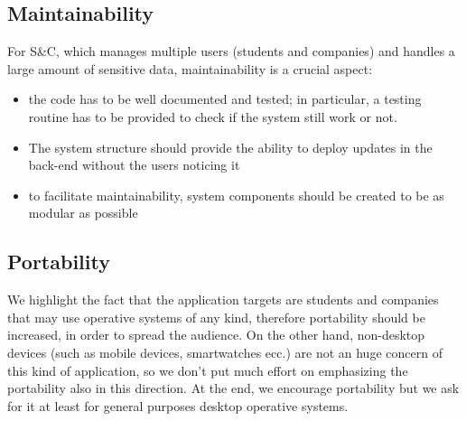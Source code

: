 		\subsection{Maintainability}
			For S\&C, which manages multiple users (students and companies) and handles a large amount of sensitive data, maintainability is a crucial aspect:
			\begin{itemize}
				\item the code has to be well documented and tested; in particular, a testing routine has to be provided to check if the system still work or not.
				\item The system structure should provide the ability to deploy updates in the back-end without the users noticing it
				\item to facilitate maintainability, system components should be created to be as modular as possible
			\end{itemize}
		\subsection{Portability}
			We highlight the fact that the application targets are students and companies that may use operative systems of any kind, therefore portability should be increased, in order to spread the audience. On the other hand, non-desktop devices (such as mobile devices, smartwatches ecc.) are not an huge concern of this kind of application, so we don't put much effort on emphasizing the portability also in this direction. At the end, we encourage portability but we ask for it at least for general purposes desktop operative systems.